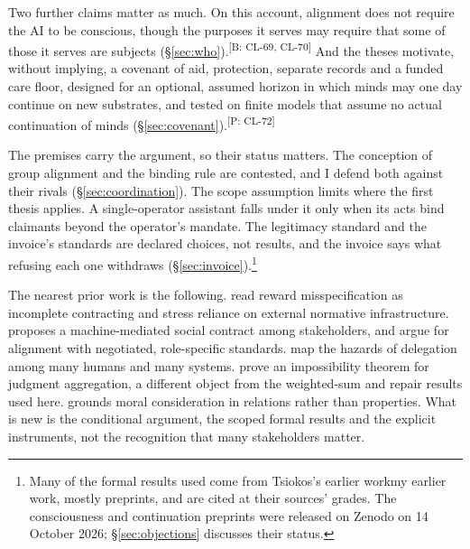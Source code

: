 \documentclass[pdflatex,sn-basic]{sn-jnl}%
\newcommand{\slot}[1]{}%
\newcommand{\claim}[2]{\ifannotated\textsuperscript{\textcolor{blue!60!black}{\tiny[#1: #2]}}\fi}
\newcommand{\renderchoice}[2]{\ifanonymous#2\else#1\fi}%
\begin{document}
Two further claims matter as much. On this account, alignment does not require the AI to be conscious, though the purposes it serves may require that some of those it serves are subjects (\S\ref{sec:who}).\claim{B}{CL-69, CL-70} And the theses motivate, without implying, a covenant of aid, protection, separate records and a funded care floor, designed for an optional, assumed horizon in which minds may one day continue on new substrates, and tested on finite models that assume no actual continuation of minds (\S\ref{sec:covenant}).\claim{P}{CL-72}

\slot{1.3}

\slot{1.4}
The premises carry the argument, so their status matters. The conception of group alignment and the binding rule are contested, and I defend both against their rivals (\S\ref{sec:coordination}). The scope assumption limits where the first thesis applies. A single-operator assistant falls under it only when its acts bind claimants beyond the operator's mandate. The legitimacy standard and the invoice's standards are declared choices, not results, and the invoice says what refusing each one withdraws (\S\ref{sec:invoice}).\footnote{Many of the formal results used come from \renderchoice{my earlier work}{Tsiokos's earlier work}, mostly preprints, and are cited at their sources' grades. The consciousness and continuation preprints were released on Zenodo on 14 October 2026; \S\ref{sec:objections} discusses their status.}

\slot{1.5}
The nearest prior work is the following. \citet{hadfieldmenell2019incomplete} read reward misspecification as incomplete contracting and stress reliance on external normative infrastructure. \citet{rahwan2018} proposes a machine-mediated social contract among stakeholders, and \citet{zhixuan2025} argue for alignment with negotiated, role-specific standards. \citet{critch2020arches} map the hazards of delegation among many humans and many systems. \citet{list2002} prove an impossibility theorem for judgment aggregation, a different object from the weighted-sum and repair results used here. \citet{coeckelbergh2010} grounds moral consideration in relations rather than properties. What is new is the conditional argument, the scoped formal results and the explicit instruments, not the recognition that many stakeholders matter.
\end{document}
